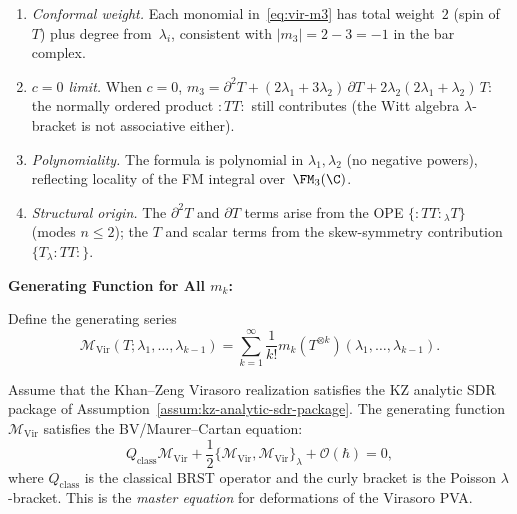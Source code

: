 \begin{remark}
\leavevmode
\begin{enumerate}
\item \emph{Conformal weight.} Each monomial in~\eqref{eq:vir-m3}
 has total weight~$2$ (spin of~$T$) plus degree from~$\lambda_i$,
 consistent with $|m_3| = 2-3 = -1$ in the bar complex.
\item \emph{$c = 0$ limit.} When $c = 0$,
 $m_3 = \partial^2 T + (2\lambda_1 + 3\lambda_2)\,\partial T
 + 2\lambda_2(2\lambda_1 + \lambda_2)\,T$:
 the normally ordered product $:TT:$ still contributes
 (the Witt algebra $\lambda$-bracket is not associative either).
\item \emph{Polynomiality.} The formula is polynomial
 in $\lambda_1, \lambda_2$ (no negative powers), reflecting
 locality of the FM integral over~$\FM_3(\C)$.
\item \emph{Structural origin.} The $\partial^2 T$ and
 $\partial T$ terms arise from the OPE $\{:TT:{}_\lambda T\}$
 (modes $n \le 2$); the $T$ and scalar terms from
 the skew-symmetry contribution $\{T_\lambda {:TT:}\}$.
\end{enumerate}
\end{remark}

\textbf{Generating Function for All $m_k$:}

Define the generating series
\begin{equation}
\mathcal{M}_{\text{Vir}}(T; \lambda_1, \ldots, \lambda_{k-1}) = \sum_{k=1}^\infty \frac{1}{k!} m_k(T^{\otimes k})(\lambda_1, \ldots, \lambda_{k-1}).
\end{equation}

\begin{theorem}
Assume that the Khan--Zeng Virasoro realization satisfies the KZ
analytic SDR package of
Assumption~\textup{\ref{assum:kz-analytic-sdr-package}}.
The generating function $\mathcal{M}_{\text{Vir}}$ satisfies the
BV/Maurer--Cartan equation:
\begin{equation}
Q_{\text{class}} \mathcal{M}_{\text{Vir}} + \frac{1}{2} \{\mathcal{M}_{\text{Vir}}, \mathcal{M}_{\text{Vir}}\}_\lambda + \mathcal{O}(\hbar)=0,
\end{equation}
where $Q_{\text{class}}$ is the classical BRST operator and the curly bracket is the Poisson $\lambda$-bracket. This is the \emph{master equation} for deformations of the Virasoro PVA.
\end{theorem}

